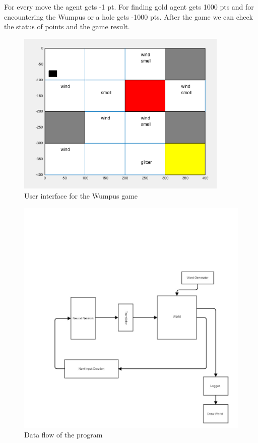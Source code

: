\documentclass[a4paper]{article}
\begin{document}
	 For every move the agent gets -1 pt. For finding gold agent gets 1000 pts and for encountering the Wumpus or a hole gets -1000 pts. After the game we can check the status of points and the game result.
	 
	 
	  \begin{figure}[!h]
		\centering	
		\includegraphics[width=0.9\textwidth]{pic/gui.png}
		\caption{User interface for the Wumpus game}
		\label{pic:gui}
	\end{figure}
	 \begin{figure}[!h]
		\centering	
		\includegraphics[width=1.2\textwidth]{pic/arch.jpg}
		\caption{Data flow of the program }
		\label{pic:flow}
	\end{figure}
\end{document}

